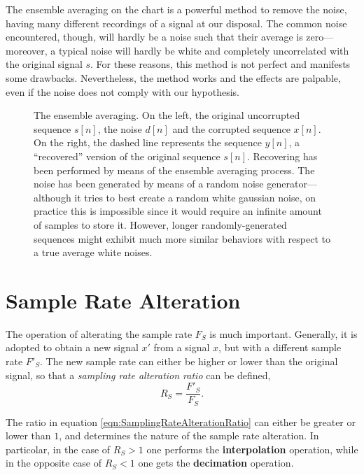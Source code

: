 \documentclass[\documentfontsize, twocolumn]{\classname}
\begin{document}
The ensemble averaging on the chart is a powerful method to remove the noise, having many different recordings of a signal at our disposal.
The common noise encountered, though, will hardly be a noise such that their average is zero---moreover, a typical noise will hardly be white and completely uncorrelated with the original signal $s$.
For these reasons, this method is not perfect and manifests some drawbacks. Nevertheless, the method works and the effects are palpable, even if the noise does not comply with our hypothesis.

\begin{figure*}[ht]
\begin{center}
\scalebox{0.32}{


}\caption{The ensemble averaging. On the left, the original uncorrupted sequence $s[n]$, the noise $d[n]$ and the corrupted sequence $x[n]$. On the right, the dashed line represents the sequence $y[n]$, a ``recovered'' version of the original sequence $s[n]$. Recovering has been performed by means of the ensemble averaging process. The noise has been generated by means of a random noise generator---although it tries to best create a random white gaussian noise, on practice this is impossible since it would require an infinite amount of samples to store it. However, longer randomly-generated sequences might exhibit much more similar behaviors with respect to a true average white noises.}\label{oct:ensembleAveraging}
\end{center}
\end{figure*}

\section{Sample Rate Alteration}

The operation of alterating the sample rate $F_S$ is much important. Generally, it is adopted to obtain a new signal $x'$ from a signal $x$, but with a different sample rate $F'_S$. The new sample rate can either be high\-er or lower than the original signal, so that a \emph{sampling rate alteration ratio} can be defined,
\begin{equation}\label{eqn:SamplingRateAlterationRatio}
	R_S = \frac{F'_S}{F_S}.
\end{equation}

The ratio in equation \ref{eqn:SamplingRateAlterationRatio} can either be greater or lower than $1$, and determines the nature of the sample rate alteration. In particolar, in the case of $R_S > 1$ one performs the \textbf{interpolation} operation, while in the opposite case of $R_S < 1$ one gets the \textbf{decimation} operation.
\end{document}
